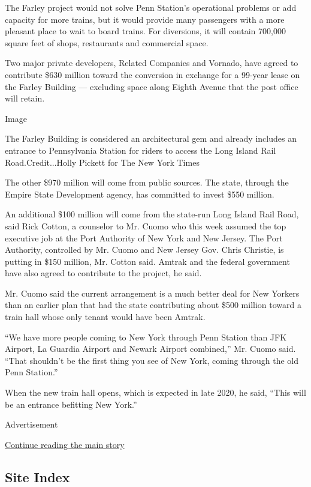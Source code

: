 The Farley project would not solve Penn Station's operational problems
or add capacity for more trains, but it would provide many passengers
with a more pleasant place to wait to board trains. For diversions, it
will contain 700,000 square feet of shops, restaurants and commercial
space.

Two major private developers, Related Companies and Vornado, have agreed
to contribute \$630 million toward the conversion in exchange for a
99-year lease on the Farley Building --- excluding space along Eighth
Avenue that the post office will retain.

Image

The Farley Building is considered an architectural gem and already
includes an entrance to Pennsylvania Station for riders to access the
Long Island Rail Road.Credit...Holly Pickett for The New York Times

The other \$970 million will come from public sources. The state,
through the Empire State Development agency, has committed to invest
\$550 million.

An additional \$100 million will come from the state-run Long Island
Rail Road, said Rick Cotton, a counselor to Mr. Cuomo who this week
assumed the top executive job at the Port Authority of New York and New
Jersey. The Port Authority, controlled by Mr. Cuomo and New Jersey Gov.
Chris Christie, is putting in \$150 million, Mr. Cotton said. Amtrak and
the federal government have also agreed to contribute to the project, he
said.

Mr. Cuomo said the current arrangement is a much better deal for New
Yorkers than an earlier plan that had the state contributing about \$500
million toward a train hall whose only tenant would have been Amtrak.

``We have more people coming to New York through Penn Station than JFK
Airport, La Guardia Airport and Newark Airport combined,'' Mr. Cuomo
said. ``That shouldn't be the first thing you see of New York, coming
through the old Penn Station.''

When the new train hall opens, which is expected in late 2020, he said,
``This will be an entrance befitting New York.''

Advertisement

\protect\hyperlink{after-bottom}{Continue reading the main story}

\hypertarget{site-index}{%
\subsection{Site Index}\label{site-index}}

